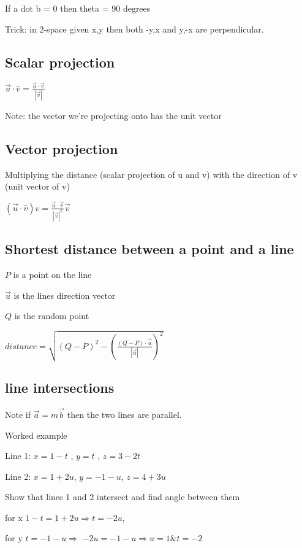 \documentclass{extarticle}
\begin{document}
\begin{multicols}{2}
If a dot b = 0 then theta = 90 degrees

Trick: in 2-space given x,y then both -y,x and y,-x are perpendicular.

\subsection{Scalar projection}

$\vec{u}\cdot\hat{v}=\frac{\vec{u}\cdot\vec{v}}{\left|\vec{v}\right|}$

Note: the vector we're projecting onto has the unit vector


\subsection{Vector projection}

Multiplying the distance (scalar projection of u and v) with the direction of v (unit vector of v)

$\left(\vec{u}\cdot\hat{v}\right)\hat{v}=\frac{\vec{u}\cdot\vec{v}}{\left|\vec{v}\right|^2}\vec{v}$

\subsection{Shortest distance between a point and a line}

$P$ is a point on the line

$\vec{u}$ is the lines direction vector

$Q$ is the random point

$distance=\sqrt{(Q-P)^2-  (\frac{(Q-P)\cdot\vec{u}}{\left|\vec{u}\right|})^2}$


\subsection{line intersections}
Note if $\vec{a} = m\vec{b}$ then the two lines are parallel.


Worked example

Line 1: $x=1-t$ , $y=t$ , $z=3-2t$

Line 2: $x=1+2u$, $y=-1-u$, $z=4+3u$

Show that lines 1 and 2 intersect and find angle between them

for x $1-t =1+2u \Rightarrow t =-2u$,

for y $t =-1-u \Rightarrow$ $ -2u=-1-u \Rightarrow u=1 \& t =-2$


\end{multicols}
\end{document}
